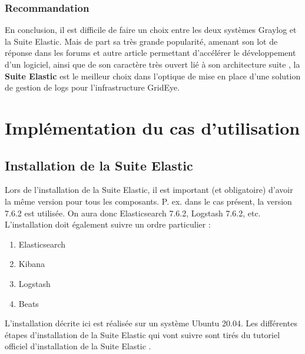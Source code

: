 \documentclass[paper=a4, fontsize=11pt]{scrartcl}
\begin{document}
\subsubsection{Recommandation}
En conclusion, il est difficile de faire un choix entre les deux systèmes Graylog et la Suite Elastic. Mais de part sa très grande popularité, amenant son lot de réponse dans les forums et autre article permettant d'accélérer le développement d'un logiciel, ainsi que de son caractère très ouvert lié à son \og architecture suite \fg, la \textbf{Suite Elastic} est le meilleur choix dans l'optique de mise en place d'une solution de gestion de logs pour l'infrastructure GridEye.

\newpage

\section{Implémentation du cas d'utilisation}

\subsection{Installation de la Suite Elastic}

Lors de l'installation de la Suite Elastic, il est important (et obligatoire) d'avoir la même version pour tous les composants. P. ex. dans le cas présent, la version 7.6.2 est utilisée. On aura donc Elasticsearch 7.6.2, Logstash 7.6.2, etc.
L'installation doit également suivre un ordre particulier :
\begin{enumerate}
    \item Elasticsearch
    \item Kibana
    \item Logstash
    \item Beats
\end{enumerate}
L'installation décrite ici est réalisée sur un système Ubuntu 20.04.
Les différentes étapes d'installation de la Suite Elastic qui vont suivre sont tirés du tutoriel officiel d'installation de la Suite Elastic \cite{noauthor_installing_nodate}.
\end{document}
